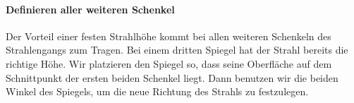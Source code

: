 \paragraph*{Definieren aller weiteren Schenkel} Der Vorteil einer festen Strahlhöhe kommt bei allen weiteren Schenkeln des Strahlengangs zum Tragen. Bei einem dritten Spiegel hat der Strahl bereits die richtige Höhe. Wir platzieren den Spiegel so, dass seine Oberfläche auf dem Schnittpunkt der ersten beiden Schenkel liegt. Dann benutzen wir die beiden Winkel des Spiegels, um die neue Richtung des Strahls zu festzulegen.











